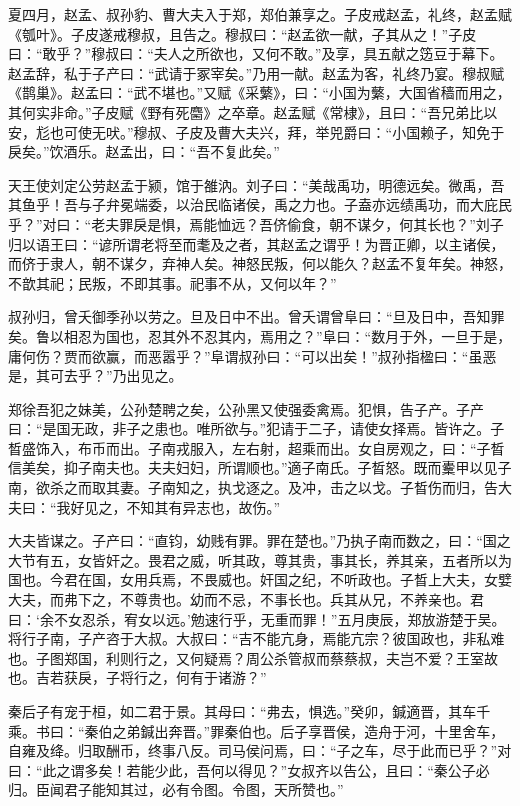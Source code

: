 \documentclass[a4paper,12pt,UTF8,twoside]{ctexbook}
\begin{document}
夏四月，赵孟、叔孙豹、曹大夫入于郑，郑伯兼享之。子皮戒赵孟，礼终，赵孟赋《瓠叶》。子皮遂戒穆叔，且告之。穆叔曰：“赵孟欲一献，子其从之！”子皮曰：“敢乎？”穆叔曰：“夫人之所欲也，又何不敢。”及享，具五献之笾豆于幕下。赵孟辞，私于子产曰：“武请于冢宰矣。”乃用一献。赵孟为客，礼终乃宴。穆叔赋《鹊巢》。赵孟曰：“武不堪也。”又赋《采蘩》，曰：“小国为蘩，大国省穑而用之，其何实非命。”子皮赋《野有死麕》之卒章。赵孟赋《常棣》，且曰：“吾兄弟比以安，尨也可使无吠。”穆叔、子皮及曹大夫兴，拜，举兕爵曰：“小国赖子，知免于戾矣。”饮酒乐。赵孟出，曰：“吾不复此矣。”

天王使刘定公劳赵孟于颍，馆于雒汭。刘子曰：“美哉禹功，明德远矣。微禹，吾其鱼乎！吾与子弁冕端委，以治民临诸侯，禹之力也。子盍亦远绩禹功，而大庇民乎？”对曰：“老夫罪戾是惧，焉能恤远？吾侪偷食，朝不谋夕，何其长也？”刘子归以语王曰：“谚所谓老将至而耄及之者，其赵孟之谓乎！为晋正卿，以主诸侯，而侪于隶人，朝不谋夕，弃神人矣。神怒民叛，何以能久？赵孟不复年矣。神怒，不歆其祀；民叛，不即其事。祀事不从，又何以年？”

叔孙归，曾夭御季孙以劳之。旦及日中不出。曾夭谓曾阜曰：“旦及日中，吾知罪矣。鲁以相忍为国也，忍其外不忍其内，焉用之？”阜曰：“数月于外，一旦于是，庸何伤？贾而欲赢，而恶嚣乎？”阜谓叔孙曰：“可以出矣！”叔孙指楹曰：“虽恶是，其可去乎？”乃出见之。

郑徐吾犯之妹美，公孙楚聘之矣，公孙黑又使强委禽焉。犯惧，告子产。子产曰：“是国无政，非子之患也。唯所欲与。”犯请于二子，请使女择焉。皆许之。子晳盛饰入，布币而出。子南戎服入，左右射，超乘而出。女自房观之，曰：“子晳信美矣，抑子南夫也。夫夫妇妇，所谓顺也。”適子南氏。子晳怒。既而櫜甲以见子南，欲杀之而取其妻。子南知之，执戈逐之。及冲，击之以戈。子晳伤而归，告大夫曰：“我好见之，不知其有异志也，故伤。”

大夫皆谋之。子产曰：“直钧，幼贱有罪。罪在楚也。”乃执子南而数之，曰：“国之大节有五，女皆奸之。畏君之威，听其政，尊其贵，事其长，养其亲，五者所以为国也。今君在国，女用兵焉，不畏威也。奸国之纪，不听政也。子晳上大夫，女嬖大夫，而弗下之，不尊贵也。幼而不忌，不事长也。兵其从兄，不养亲也。君曰：‘余不女忍杀，宥女以远。’勉速行乎，无重而罪！”五月庚辰，郑放游楚于吴。将行子南，子产咨于大叔。大叔曰：“吉不能亢身，焉能亢宗？彼国政也，非私难也。子图郑国，利则行之，又何疑焉？周公杀管叔而蔡蔡叔，夫岂不爱？王室故也。吉若获戾，子将行之，何有于诸游？”

秦后子有宠于桓，如二君于景。其母曰：“弗去，惧选。”癸卯，鍼適晋，其车千乘。书曰：“秦伯之弟鍼出奔晋。”罪秦伯也。后子享晋侯，造舟于河，十里舍车，自雍及绛。归取酬币，终事八反。司马侯问焉，曰：“子之车，尽于此而已乎？”对曰：“此之谓多矣！若能少此，吾何以得见？”女叔齐以告公，且曰：“秦公子必归。臣闻君子能知其过，必有令图。令图，天所赞也。”
\end{document}
